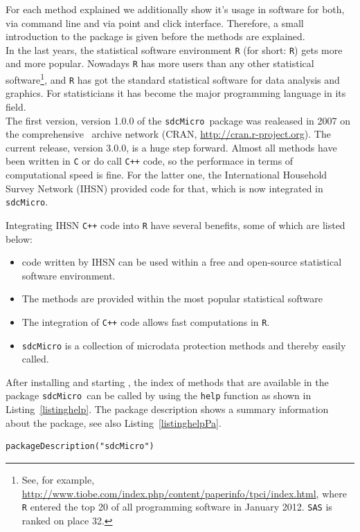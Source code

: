 \documentclass[12pt]{article}
\newcommand{\sdcMicro}{\texttt{sdcMicro}}
\begin{document}
For each method explained we additionally show it's usage in software for both, 
via command line and
via point and click interface. 
Therefore, a small introduction to the package is given before 
the methods are explained. \\

In the last years, the statistical software environment \texttt{R} \citep{RDev}
(for short: \texttt{R}) gets more and more popular. Nowadays \texttt{R} has
more users than any other statistical software\footnote{See, for
example, \href{http://www.tiobe.com/index.php/content/paperinfo/tpci/index.html}{http://www.tiobe.com/index.php/content/paperinfo/tpci/index.html},
where \texttt{R} entered the top 20 of all programming software in January
2012. \texttt{SAS} is ranked on place 32.}, and \texttt{R} has got the standard
statistical software for data analysis and graphics. For statisticians it
has become the major programming language in its field. \\

The first version, version 1.0.0 of the \sdcMicro \ package was realeased in 2007 on the 
comprehensive \R \ archive
network (CRAN, \href{http://cran.r-project.org}{http://cran.r-project.org}). The current release, version 3.0.0, is a huge step forward.
Almost all methods have been written in \texttt{C} or do call \texttt{C++} code, so the performace
 in terms of computational speed is fine.
For the latter one, the International Household Survey Network (IHSN) provided code for that, which
is now integrated in \sdcMicro.
  
Integrating IHSN \texttt{C++} code into \texttt{R} have several benefits, 
some of which are listed below:
\begin{itemize}
  \item code written by IHSN can be used within a free and open-source 
  statistical software environment.
  \item The methods are provided within the most popular statistical software
  \item The integration of \texttt{C++} code allows fast computations in
  \texttt{R}.
  \item \texttt{sdcMicro} is a collection of microdata protection methods and
  thereby easily called.
\end{itemize}
  
After installing and starting \R , the index of methods that are available  
in the package \sdcMicro \ can be called by using the \lstinline{help} function as shown in 
Listing~\ref{listinghelp}. The package description shows a summary information about the 
package, see also Listing~\ref{listinghelpPa}.
\begin{lstlisting}[frame=single, label={listinghelpPa}, caption={Accessing the index file to list the available methods in \sdcMicro.}] 
packageDescription("sdcMicro") 
\end{lstlisting}
\end{document}

